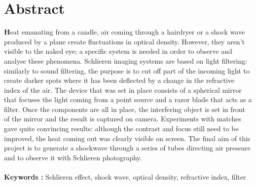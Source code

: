 \section*{Abstract}
\textbf{H}eat emanating from a candle, air coming through a hairdryer or a shock wave produced by a plane create
fluctuations in optical density. However, they aren't visible to the naked eye; a specific system is needed
in order to observe and analyse these phenomena. Schlieren imaging systems are based on light filtering:
similarly to sound filtering, the purpose is to cut off part of the incoming light to create darker spots
where it has been deflected by a change in the refractive index of the air. The device that was set in place
consists of a spherical mirror that focuses the light coming from a point source and a razor blade that acts
as a filter. Once the components are all in place, the interfering object is set in front of the mirror and the
result is captured on camera. Experiments with matches gave quite convincing results: although the
contrast and focus still need to be improved, the heat coming out was clearly visible on screen. The final
aim of this project is to generate a shockwave through a series of tubes directing air pressure and to
observe it with Schlieren photography.
\\
\\
\small{\textbf{Keywords :} Schlieren effect, shock wave, optical density, refractive index, filter}
